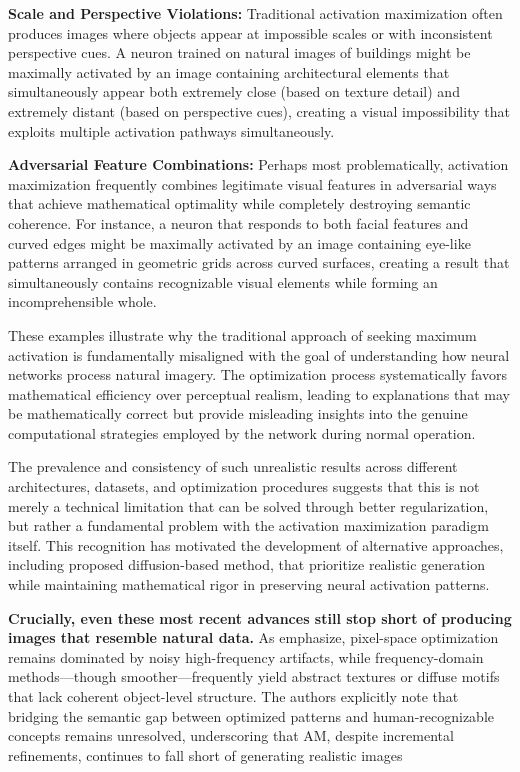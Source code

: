 \textbf{Scale and Perspective Violations:} Traditional activation maximization often produces images where objects appear at impossible scales or with inconsistent perspective cues. A neuron trained on natural images of buildings might be maximally activated by an image containing architectural elements that simultaneously appear both extremely close (based on texture detail) and extremely distant (based on perspective cues), creating a visual impossibility that exploits multiple activation pathways simultaneously.

\textbf{Adversarial Feature Combinations:} Perhaps most problematically, activation maximization frequently combines legitimate visual features in adversarial ways that achieve mathematical optimality while completely destroying semantic coherence. For instance, a neuron that responds to both facial features and curved edges might be maximally activated by an image containing eye-like patterns arranged in geometric grids across curved surfaces, creating a result that simultaneously contains recognizable visual elements while forming an incomprehensible whole.

These examples illustrate why the traditional approach of seeking maximum activation is fundamentally misaligned with the goal of understanding how neural networks process natural imagery. The optimization process systematically favors mathematical efficiency over perceptual realism, leading to explanations that may be mathematically correct but provide misleading insights into the genuine computational strategies employed by the network during normal operation.

The prevalence and consistency of such unrealistic results across different architectures, datasets, and optimization procedures suggests that this is not merely a technical limitation that can be solved through better regularization, but rather a fundamental problem with the activation maximization paradigm itself. This recognition has motivated the development of alternative approaches, including proposed diffusion-based method, that prioritize realistic generation while maintaining mathematical rigor in preserving neural activation patterns.

\textbf{Crucially, even these most recent advances still stop short of producing images that resemble natural data.} As \citet{zhu2025representationunderstandingactivationmaximization} emphasize, pixel-space optimization remains dominated by noisy high-frequency artifacts, while frequency-domain methods—though smoother—frequently yield abstract textures or diffuse motifs that lack coherent object-level structure. The authors explicitly note that bridging the semantic gap between optimized patterns and human-recognizable concepts remains unresolved, underscoring that AM, despite incremental refinements, continues to fall short of generating realistic images

